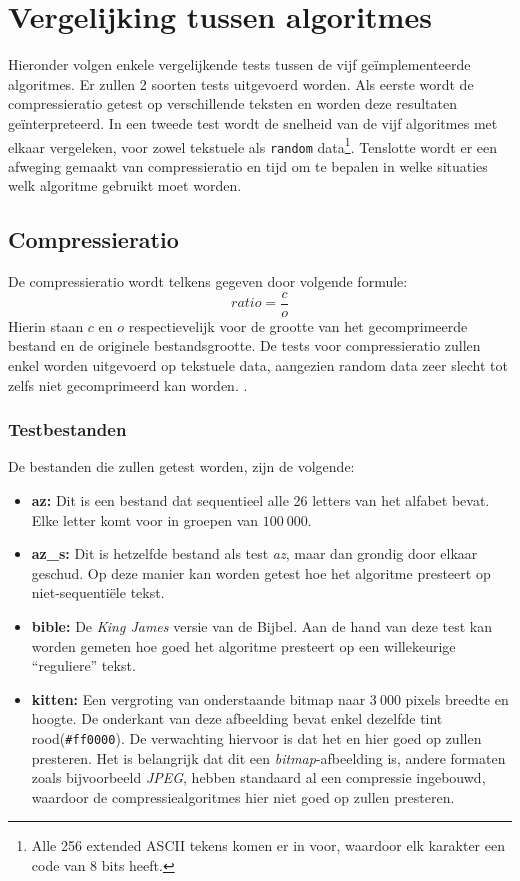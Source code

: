 \chapter{Vergelijking tussen algoritmes}
Hieronder volgen enkele vergelijkende tests tussen de vijf ge\"implementeerde algoritmes. Er zullen 2 soorten tests uitgevoerd worden. Als eerste wordt de compressieratio getest op verschillende teksten en worden deze resultaten ge\"interpreteerd. In een tweede test wordt de snelheid van de vijf algoritmes met elkaar vergeleken, voor zowel tekstuele als \texttt{random} data\footnote{Alle 256 extended ASCII tekens komen er in voor, waardoor elk karakter een code van 8 bits heeft.}. Tenslotte wordt er een afweging gemaakt van compressieratio en tijd om te bepalen in welke situaties welk algoritme gebruikt moet worden.

\section{Compressieratio}
De compressieratio wordt telkens gegeven door volgende formule:
$$ratio = \frac{c}{o}$$
Hierin staan $c$ en $o$ respectievelijk voor de grootte van het gecomprimeerde bestand en de originele bestandsgrootte. De tests voor compressieratio zullen enkel worden uitgevoerd op tekstuele data, aangezien random data zeer slecht tot zelfs niet gecomprimeerd kan worden. \cite{ad3cursus}.

\subsection{Testbestanden}
De bestanden die zullen getest worden, zijn de volgende:
\begin{itemize}
	\item \textbf{az: } Dit is een bestand dat sequentieel alle 26 letters van het alfabet bevat. Elke letter komt voor in groepen van $100\ 000$.
	\item \textbf{az\_s:} Dit is hetzelfde bestand als test \emph{az}, maar dan grondig door elkaar geschud. Op deze manier kan worden getest hoe het algoritme presteert op niet-sequenti\"ele tekst.
	\item \textbf{bible:} De \emph{King James} versie van de Bijbel. \cite{gutenbergbible} Aan de hand van deze test kan worden gemeten hoe goed het algoritme presteert op een willekeurige ``reguliere'' tekst.
	\item \textbf{kitten:} Een vergroting van onderstaande bitmap naar $3\ 000$ pixels breedte en hoogte. De onderkant van deze afbeelding bevat enkel dezelfde tint rood(\texttt{\#ff0000}). De verwachting hiervoor is dat het \huffslid en \huffblock hier goed op zullen presteren. Het is belangrijk dat dit een \emph{bitmap}-afbeelding is, andere formaten zoals bijvoorbeeld \emph{JPEG}, hebben standaard al een compressie ingebouwd, waardoor de compressiealgoritmes hier niet goed op zullen presteren.
\end{itemize}

